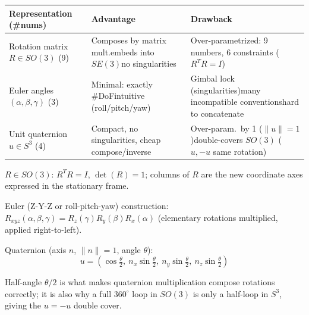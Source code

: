 \begin{center}\small
\renewcommand{\arraystretch}{1.2}
\begin{tabular}{@{}p{2.2cm}p{2.55cm}p{2.55cm}@{}}
\toprule
Representation (\#nums) & Advantage & Drawback \\
\midrule
Rotation matrix $R\in SO(3)$ (9) &
Composes by matrix mult.\newline embeds into $SE(3)$\newline no singularities &
Over-parametrized: 9 numbers, 6 constraints ($R^TR=I$) \\[14pt]
Euler angles $(\alpha,\beta,\gamma)$ (3) &
Minimal: exactly \#DoF\newline intuitive (roll/pitch/yaw) &
Gimbal lock (singularities)\newline many incompatible conventions\newline hard to concatenate \\[14pt]
Unit quaternion $u\in S^3$ (4) &
Compact, no singularities, cheap compose/inverse &
Over-param.\ by 1 ($\|u\|=1$)\newline double-covers $SO(3)$ ($u,-u$ same rotation) \\
\bottomrule
\end{tabular}
\end{center}

$R\in SO(3)$: $R^TR=I$, $\det(R)=1$; columns of $R$ are the new coordinate axes expressed in the stationary frame.

Euler (Z-Y-Z or roll-pitch-yaw) construction: $R_{xyz}(\alpha,\beta,\gamma)=R_z(\gamma)R_y(\beta)R_x(\alpha)$ (elementary rotations multiplied, applied right-to-left).

Quaternion (axis $n$, $\|n\|=1$, angle $\theta$):
\[
u=\left(\cos\tfrac{\theta}{2},\ n_x\sin\tfrac{\theta}{2},\ n_y\sin\tfrac{\theta}{2},\ n_z\sin\tfrac{\theta}{2}\right)
\]


\begin{democallout}
\end{democallout}

\begin{notebox}
Half-angle $\theta/2$ is what makes quaternion multiplication compose rotations correctly; it is also why a full $360^\circ$ loop in $SO(3)$ is only a half-loop in $S^3$, giving the $u=-u$ double cover.
\end{notebox}


